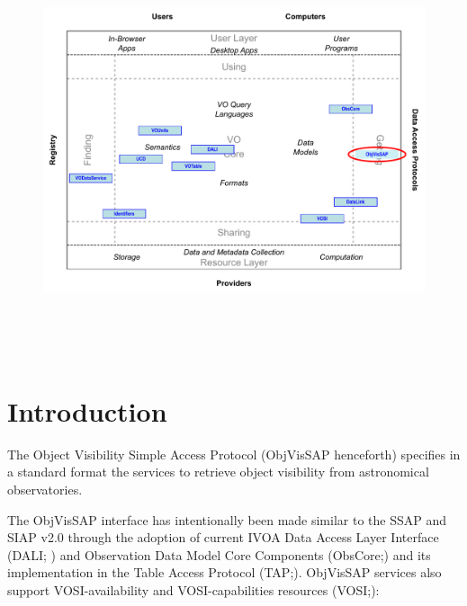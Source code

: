 \documentclass[11pt,a4paper]{ivoatex/ivoa}
\begin{document}

\begin{figure}[H]
\advance\leftskip 0.0in
\includegraphics[width=6.0in,height=4.73in]{./role_diagram.pdf}
\end{figure}


\pagebreak



\section{Introduction}\label{section:_Toc415497365}


The Object Visibility Simple Access Protocol (ObjVisSAP henceforth)
specifies in a standard format the services to retrieve object
visibility from astronomical observatories.



The ObjVisSAP interface has intentionally been made similar to the SSAP
\citep{2012ivoa.spec.0210T} and SIAP v2.0 \citep{2015ivoa.spec.0617D} through the adoption
of current IVOA Data Access Layer Interface (DALI; \citealt{2017ivoa.spec.0517D}) and Observation Data
Model Core Components (ObsCore;\citealt{2017ivoa.spec.0509L}) and its implementation in
the Table Access Protocol (TAP;\citealt{2019ivoa.spec.0927D}). ObjVisSAP services also support
VOSI-availability and VOSI-capabilities resources (VOSI;\citealt{2017ivoa.spec.0524G}):
\end{document}
